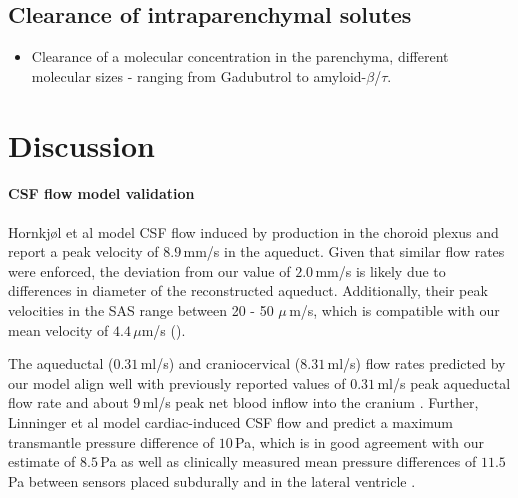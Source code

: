 \documentclass[fleqn,10pt]{wlscirep}
\begin{document}
\subsection*{Clearance of intraparenchymal solutes}

\begin{itemize}
\item
  Clearance of a molecular concentration in the parenchyma, different
  molecular sizes - ranging from Gadubutrol to amyloid-$\beta$/$\tau$.
\end{itemize}

\bigskip

\FloatBarrier
\newpage
\section*{Discussion}

\paragraph{CSF flow model validation}

Hornkjøl et al \cite{hornkjol2022csf} model CSF flow induced by production in the choroid plexus and report a peak velocity of $8.9\,$mm/s in the aqueduct. Given that similar flow rates were enforced, the deviation from our value of $2.0\,$mm/s is likely due to differences in diameter of the reconstructed aqueduct. Additionally, their peak velocities in the SAS range between 20 - 50 $\mu\,$m/s, which is compatible with our mean velocity of $4.4\,\mu$m/s ().

The aqueductal ($0.31\,$ml/s) and craniocervical ($8.31\,$ml/s) flow rates predicted by our model align well with previously reported values of $0.31\,$ml/s peak aqueductal flow rate \cite{vinje2019respiratory} and about $9\,$ml/s peak net blood inflow into the cranium \cite{baledent2014imaging}. Further, Linninger et al \cite{linninger2007cerebrospinal} model cardiac-induced CSF flow and predict a maximum transmantle pressure difference of $10\,$Pa, which is in good agreement with our estimate of $8.5\,$Pa as well as clinically measured mean pressure differences of $11.5\,$Pa between sensors placed subdurally and in the lateral ventricle \cite{vinje2019respiratory}.
\end{document}
